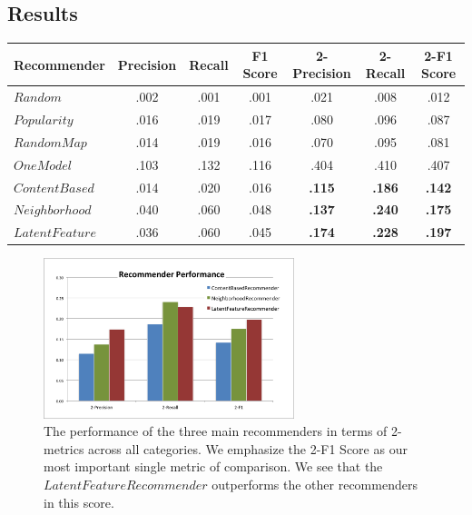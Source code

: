 \documentclass[11pt]{article}
\begin{document}
\subsection*{Results}

\begin{center}
\begin{tabular}{ | l || c | c | c || c | c | c |}
\hline
Recommender & Precision & Recall & F1 Score & 2-Precision & 2-Recall & 2-F1 Score \\ \hline\hline
$Random$ & .002 & .001 & .001 & .021 & .008 & .012 \\ \hline
$Popularity$ & .016 & .019 & .017 & .080 & .096 & .087 \\ \hline
$RandomMap$ & .014 & .019 & .016 & .070 & .095 & .081 \\ \hline
$OneModel$ & .103 & .132 & .116 & .404 & .410 & .407 \\ \hline
$ContentBased$ & .014 & .020 & .016 &
\textbf{.115} & \textbf{.186} & \textbf{.142} \\ \hline 
$Neighborhood$ & .040 & .060 & .048 &
\textbf{.137} & \textbf{.240} & \textbf{.175} \\ \hline 
$LatentFeature$ & .036 & .060 & .045 &
\textbf{.174} & \textbf{.228} & \textbf{.197} \\ \hline

\end{tabular}
\end{center}

\begin{figure}[!htbp]
    \centering
    \includegraphics[width=0.65\textwidth]{RecommenderPerformance.png}
	\caption{The performance of the three main recommenders in terms of
    2-metrics across all categories. We emphasize the 2-F1 Score as our most
    important single metric of comparison. We see that the $LatentFeatureRecommender$
    outperforms the other recommenders in this score.} 
    \label{fig:RecommenderPerformance} 
\end{figure}
\end{document}
